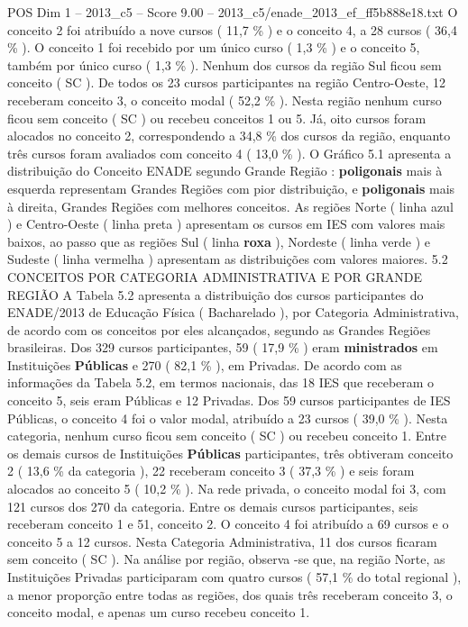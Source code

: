 \begin{textsample}{POS Dim 1 – 2013\_c5 – Score 9.00 – 2013\_c5/enade\_2013\_ef\_ff5b888e18.txt}
O conceito 2 foi atribuído a nove cursos ( 11,7 \% ) e o conceito 4, a 28 cursos ( 36,4 \% ).
O conceito 1 foi recebido por um único curso ( 1,3 \% ) e o conceito 5, também por único curso ( 1,3 \% ).
Nenhum dos cursos da região Sul ficou sem conceito ( SC ).
De todos os 23 cursos participantes na região Centro-Oeste, 12 receberam conceito 3, o conceito modal ( 52,2 \% ).
Nesta região nenhum curso ficou sem conceito ( SC ) ou recebeu conceitos 1 ou 5.
Já, oito cursos foram alocados no conceito 2, correspondendo a 34,8 \% dos cursos da região, enquanto três cursos foram avaliados com conceito 4 ( 13,0 \% ).
O Gráfico 5.1 apresenta a distribuição do Conceito ENADE segundo Grande Região : \textbf{poligonais} mais à esquerda representam Grandes Regiões com pior distribuição, e \textbf{poligonais} mais à direita, Grandes Regiões com melhores conceitos.
As regiões Norte ( linha azul ) e Centro-Oeste ( linha preta ) apresentam os cursos em IES com valores mais baixos, ao passo que as regiões Sul ( linha \textbf{roxa} ), Nordeste ( linha verde ) e Sudeste ( linha vermelha ) apresentam as distribuições com valores maiores. 5.2 CONCEITOS POR CATEGORIA ADMINISTRATIVA E POR GRANDE REGIÃO A Tabela 5.2 apresenta a distribuição dos cursos participantes do ENADE/2013 de Educação Física ( Bacharelado ), por Categoria Administrativa, de acordo com os conceitos por eles alcançados, segundo as Grandes Regiões brasileiras.
Dos 329 cursos participantes, 59 ( 17,9 \% ) eram \textbf{ministrados} em Instituições \textbf{Públicas} e 270 ( 82,1 \% ), em Privadas.
De acordo com as informações da Tabela 5.2, em termos nacionais, das 18 IES que receberam o conceito 5, seis eram Públicas e 12 Privadas.
Dos 59 cursos participantes de IES Públicas, o conceito 4 foi o valor modal, atribuído a 23 cursos ( 39,0 \% ).
Nesta categoria, nenhum curso ficou sem conceito ( SC ) ou recebeu conceito 1.
Entre os demais cursos de Instituições \textbf{Públicas} participantes, três obtiveram conceito 2 ( 13,6 \% da categoria ), 22 receberam conceito 3 ( 37,3 \% ) e seis foram alocados ao conceito 5 ( 10,2 \% ).
Na rede privada, o conceito modal foi 3, com 121 cursos dos 270 da categoria.
Entre os demais cursos participantes, seis receberam conceito 1 e 51, conceito 2.
O conceito 4 foi atribuído a 69 cursos e o conceito 5 a 12 cursos.
Nesta Categoria Administrativa, 11 dos cursos ficaram sem conceito ( SC ).
Na análise por região, observa -se que, na região Norte, as Instituições Privadas participaram com quatro cursos ( 57,1 \% do total regional ), a menor proporção entre todas as regiões, dos quais três receberam conceito 3, o conceito modal, e apenas um curso recebeu conceito 1.

\end{textsample}
